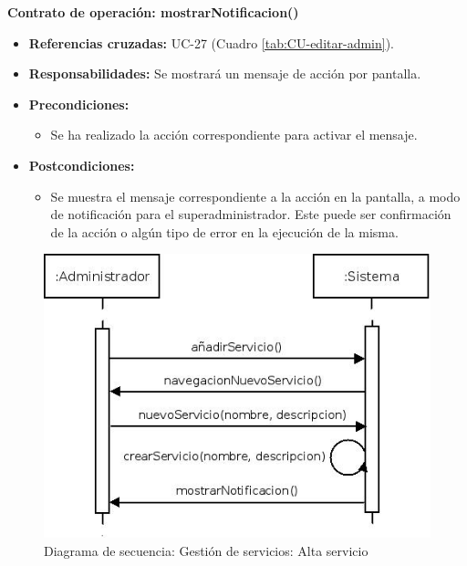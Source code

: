 \textbf{Contrato de operación: mostrarNotificacion()}
\begin{itemize}
\item \textbf{Referencias cruzadas:} UC-27 (Cuadro \ref{tab:CU-editar-admin}).
\item \textbf{Responsabilidades:} Se mostrará un mensaje de acción por pantalla.
\item \textbf{Precondiciones:} 
 \begin{itemize}
\item Se ha realizado la acción correspondiente para activar el mensaje.
\end {itemize}
\item \textbf{Postcondiciones:} 
 \begin{itemize}
\item Se muestra el mensaje correspondiente a la acción en la pantalla, a modo de notificación para el superadministrador. Este puede ser confirmación de la acción o algún tipo de error en la ejecución de la misma.
\end {itemize}
\end {itemize}


\vspace{10mm}

\begin{figure}[H]
\centering
  \includegraphics[scale=.55]{img/secuencias/gestion-servicios-alta-servicio.jpeg}
  \caption{Diagrama de secuencia: Gestión de servicios: Alta servicio}
  \label{fig:secuencia-gestion-servicios-alta-servicio}
\end{figure}

